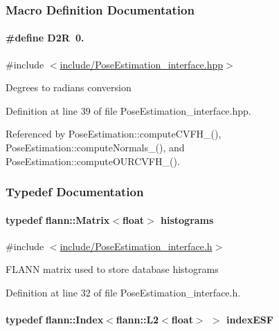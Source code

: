 \subsubsection{Macro Definition Documentation}
\hypertarget{group__Definitions_ga0a3cc1d5cde549e408f825ddd7f5853d}{
\paragraph[{D2\-R}]{\setlength{\rightskip}{0pt plus 5cm}\#define D2\-R~0.}}\label{group__Definitions_ga0a3cc1d5cde549e408f825ddd7f5853d}


{\ttfamily \#include $<$\hyperlink{PoseEstimation__interface_8hpp}{include/\-Pose\-Estimation\-\_\-interface.\-hpp}$>$}

Degrees to radians conversion 

Definition at line 39 of file Pose\-Estimation\-\_\-interface.\-hpp.



Referenced by Pose\-Estimation\-::compute\-C\-V\-F\-H\-\_\-(), Pose\-Estimation\-::compute\-Normals\-\_\-(), and Pose\-Estimation\-::compute\-O\-U\-R\-C\-V\-F\-H\-\_\-().



\subsubsection{Typedef Documentation}
\hypertarget{group__Definitions_ga136493056b2eaf642f660e6a45a62991}{
\paragraph[{histograms}]{\setlength{\rightskip}{0pt plus 5cm}typedef flann\-::\-Matrix$<$float$>$ {\bf histograms}}}\label{group__Definitions_ga136493056b2eaf642f660e6a45a62991}


{\ttfamily \#include $<$\hyperlink{PoseEstimation__interface_8h}{include/\-Pose\-Estimation\-\_\-interface.\-h}$>$}

F\-L\-A\-N\-N matrix used to store database histograms 

Definition at line 32 of file Pose\-Estimation\-\_\-interface.\-h.

\hypertarget{group__Definitions_ga3f45d3216269cf676ea864ae3bfcc446}{
\paragraph[{index\-E\-S\-F}]{\setlength{\rightskip}{0pt plus 5cm}typedef flann\-::\-Index$<$flann\-::\-L2$<$float$>$ $>$ {\bf index\-E\-S\-F}}}\label{group__Definitions_ga3f45d3216269cf676ea864ae3bfcc446}


